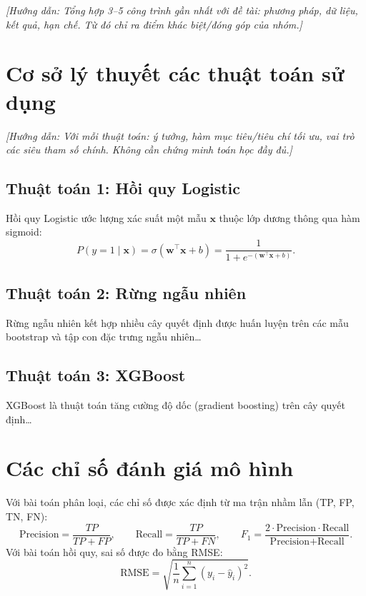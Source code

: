 \documentclass[12pt,a4paper,oneside]{report}
\newcommand{\huongdan}[1]{{\color{guide}\itshape [Hướng dẫn: #1]}}
\begin{document}
\huongdan{Tổng hợp 3--5 công trình gần nhất với đề tài: phương pháp, dữ liệu,
kết quả, hạn chế. Từ đó chỉ ra điểm khác biệt/đóng góp của nhóm.}

\section{Cơ sở lý thuyết các thuật toán sử dụng}
\huongdan{Với mỗi thuật toán: ý tưởng, hàm mục tiêu/tiêu chí tối ưu, vai trò
các siêu tham số chính. Không cần chứng minh toán học đầy đủ.}

\subsection{Thuật toán 1: Hồi quy Logistic}
Hồi quy Logistic ước lượng xác suất một mẫu $\mathbf{x}$ thuộc lớp dương
thông qua hàm sigmoid:
\begin{equation}
  P(y=1 \mid \mathbf{x}) = \sigma(\mathbf{w}^{\top}\mathbf{x}+b)
  = \frac{1}{1+e^{-(\mathbf{w}^{\top}\mathbf{x}+b)}}.
  \label{eq:sigmoid}
\end{equation}

\subsection{Thuật toán 2: Rừng ngẫu nhiên}
Rừng ngẫu nhiên \cite{breiman2001} kết hợp nhiều cây quyết định được huấn
luyện trên các mẫu bootstrap và tập con đặc trưng ngẫu nhiên\dots

\subsection{Thuật toán 3: XGBoost}
XGBoost \cite{chen2016} là thuật toán tăng cường độ dốc (gradient boosting)
trên cây quyết định\dots

\section{Các chỉ số đánh giá mô hình}
Với bài toán phân loại, các chỉ số được xác định từ ma trận nhầm lẫn
(TP, FP, TN, FN):
\begin{equation}
  \text{Precision} = \frac{TP}{TP+FP},\qquad
  \text{Recall} = \frac{TP}{TP+FN},\qquad
  F_1 = \frac{2\cdot\text{Precision}\cdot\text{Recall}}{\text{Precision}+\text{Recall}}.
  \label{eq:f1}
\end{equation}
Với bài toán hồi quy, sai số được đo bằng RMSE:
\begin{equation}
  \text{RMSE} = \sqrt{\frac{1}{n}\sum_{i=1}^{n}\left(y_i-\hat{y}_i\right)^2}.
  \label{eq:rmse}
\end{equation}
\end{document}
